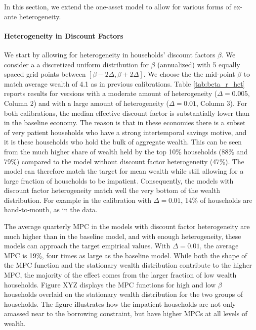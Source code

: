 In this section, we extend the one-asset model to allow for various forms of ex-ante heterogeneity.

\paragraph{Heterogeneity in Discount Factors} \label{sec:one_asset_discounting}

We start by allowing for heterogeneity in households' discount factors $\beta$. We consider a a discretized uniform distribution for $\beta $ (annualized) with 5 equally spaced grid points between $[\beta -2\Delta,\beta +2\Delta ]$. We choose the the mid-point $\beta $ to match average wealth of 4.1 as in previous calibrations. Table \ref{tab:beta_r_het} reports results for versions with a moderate amount of heterogeneity ($\Delta = 0.005$, Column 2) and with a large amount of heterogeneity ($\Delta = 0.01$, Column 3). For both calibrations, the median effective discount factor is substantially lower than in the baseline economy. The reason is that in these economies there is a subset of very patient households who have a strong intertemporal savings motive, and it is these households who hold the bulk of aggregate wealth. This can be seen from the much higher share of wealth held by the top 10\% households (88\% and 79\%) compared to the model without discount factor heterogeneity (47\%). The model can therefore match the target for mean wealth while still allowing for a large fraction of households to be impatient. Consequently, the models with discount factor heterogeneity match well the very bottom of the wealth distribution. For example in the calibration with $\Delta=0.01$, 14\% of households are hand-to-mouth, as in the data.

The average quarterly MPC in the models with discount factor heterogeneity are much higher than in the baseline model, and with enough heterogeneity, these models can approach the target empirical values. With $\Delta=0.01$, the average MPC is 19\%, four times as large as the baseline model. While both the shape of the MPC function and the stationary wealth distribution contribute to the higher MPC, the majority of the effect comes from the larger fraction of low wealth households. Figure XYZ displays the MPC functions for high and low $\beta$ households overlaid on the stationary wealth distribution for the two groups of households. The figure illustrates how the impatient households are not only amassed near to the borrowing constraint, but have higher MPCs at all levels of wealth.

